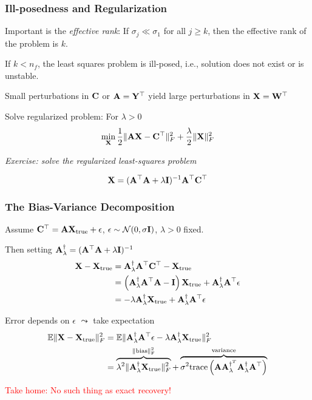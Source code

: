 \documentclass[12pt,fleqn,beamer]{beamer}
\begin{document}
\begin{frame}\frametitle{Ill-posedness and Regularization}

Important is the \emph{effective rank}: If $\sigma_j \ll \sigma_1$ for all
$j\geq k$, then the effective rank of the problem is $k$.

\bigskip

If $k < n_f$, the least squares problem is ill-posed, i.e., solution does not exist or is unstable.

Small perturbations
in ${\bf C}$ or ${\bf A}={\bf Y}^\top$ yield large perturbations in ${\bf X} = {\bf W}^\top$

\bigskip

Solve regularized problem: For $\lambda>0$
$$ \min_{\bf X} {\frac 12} \|{\bf A}{\bf X} - {\bf C}^\top\|_F^2 + {\frac {\lambda}2} \|{\bf X}\|_F^2 $$

{
{\em Exercise: solve the regularized least-squares problem}
}
\pause


$$ {\bf X} = ({\bf A}^{\top} {\bf A} + \lambda {\bf I})^{-1} {\bf A}^{\top} {\bf C}^\top $$
\end{frame}

\begin{frame}\frametitle{The Bias-Variance Decomposition}

Assume ${\bf C}^\top = {\bf A} {\bf X}_{\rm true}  + \epsilon$, $\epsilon \sim\mathcal{N}(0,\sigma {\bf I})$,  $\lambda>0$ fixed.

Then setting  ${\bf A}^{\dag}_{\lambda} = ({\bf A}^{\top} {\bf A} + \lambda {\bf I})^{-1}$
\begin{align*}
	{\bf X} - {\bf X}_{\rm true} & = {\bf A}^{\dag}_{\lambda} {\bf A}^{\top} {\bf C}^\top - {\bf X}_{\rm true} \\
	                      & = \left({\bf A}^{\dag}_{\lambda} {\bf A}^{\top} {\bf A} - {\bf I} \right)  {\bf X}_{\rm true} +
	{\bf A}^{\dag}_{\lambda} {\bf A}^{\top} \epsilon \\
	                     & = -\lambda {\bf A}^{\dag}_{\lambda}{\bf X}_{\rm true}+
	{\bf A}^{\dag}_{\lambda} {\bf A}^{\top} \epsilon
\end{align*}

\pause

Error depends on $\epsilon$ $\leadsto$ take expectation
\begin{align*}
 {\mathbb E} \|{\bf X} - {\bf X}_{\rm true}\|_F^2 &= {\mathbb E}
\|{\bf A}^{\dag}_{\lambda} {\bf A}^{\top} \epsilon -\lambda {\bf A}^{\dag}_{\lambda}{\bf X}_{\rm true} \|_F^2   \\
&=\overbrace{ \lambda^2 \|{\bf A}^{\dag}_{\lambda}{\bf X}_{\rm true}\|_F^2}^{\rm \|bias\|_F^2} +
\overbrace{\sigma^2 {\rm trace}\left( {\bf A} {\bf A}^{\dag^T}_{\lambda} {\bf A}^{\dag}_{\lambda} {\bf A}^{\top} \right)}^{\rm variance}
\end{align*}

\pause
\begin{center}
	\textcolor{red}{Take home: No such thing as exact recovery!}	
\end{center}


\end{frame}
\end{document}
